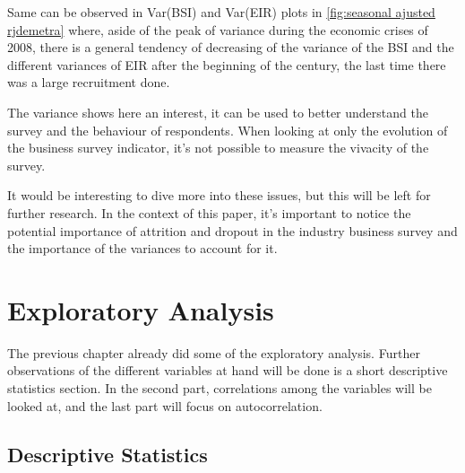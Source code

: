 \documentclass[12pt,a4paper,oneside]{book}
\begin{document}
Same can be observed in Var(BSI) and Var(EIR) plots in \autoref{fig:seasonal ajusted rjdemetra} where, aside of the peak of variance during the economic crises of 2008, there is a general tendency of decreasing of the variance of the BSI and the different variances of EIR after the beginning of the century, the last time there was a large recruitment done.

The variance shows here an interest, it can be used to better understand the survey and the behaviour of respondents.
When looking at only the evolution of the business survey indicator, it's not possible to measure the vivacity of the survey.

It would be interesting to dive more into these issues, but this will be left for further research. 
In the context of this paper, it's important to notice the potential importance of attrition and dropout in the industry business survey and the importance of the variances to account for it.



\chapter{Exploratory Analysis}

The previous chapter already did some of the exploratory analysis.
Further observations of the different variables at hand will be done is a short descriptive statistics section.
In the second part, correlations among the variables will be looked at, and the last part will focus on autocorrelation.


\section{Descriptive Statistics}
\end{document}
